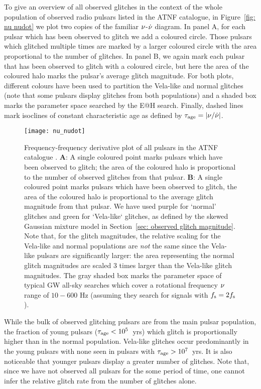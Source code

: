 \documentclass[../full_thesis/full_thesis.tex]{subfiles}
\begin{document}
To give an overview of all observed glitches in the context of the whole population of
observed radio pulsars listed in the ATNF catalogue, in Figure~\ref{fig: nu
nudot} we plot two copies of the familiar $\nu$-$\dot{\nu}$ diagram. In panel A, for each
pulsar which has been observed to glitch we add a coloured circle. Those
pulsars which glitched multiple times are marked by a larger coloured circle
with the area proportional to the number of glitches. In panel B, we again mark
each pulsar that has been observed to glitch with a coloured circle, but here
the area of the coloured halo marks the pulsar's average glitch magnitude.
For both plots, different
colours have been used to partition the Vela-like and normal glitches (note that some
pulsars display glitches from both populations) and a shaded box marks the
parameter space searched by the E@H search. Finally, dashed lines mark isoclines
of constant characteristic age as defined by $\tau_{\mathrm{age}} = \left|\nu/\dot{\nu}\right|$.
\begin{figure}[htb]
\centering
\texttt{[image: nu\_nudot]}
\caption{Frequency-frequency derivative plot of all pulsars in the ATNF
catalogue \citep{ATNF}. \textbf{A}: A single coloured point marks pulsars which have been
observed to glitch; the area of the coloured halo is proportional to the
number of observed glitches from that pulsar. \textbf{B}: A single coloured
point marks pulsars which have been observed to glitch, the area of the coloured
halo is proportional to the average glitch magnitude from that pulsar. We have used
purple for `normal' glitches and green for `Vela-like` glitches, as defined by
the skewed Gaussian mixture model in Section~\ref{sec: observed glitch magnitude}. Note
that, for the glitch magnitudes, the relative scaling for the Vela-like and
normal populations are \emph{not}
the same since the Vela-like pulsars are significantly larger: the area representing
the normal glitch magnitudes are scaled 3 times larger than the Vela-like glitch
magnitudes.
The gray shaded box marks the parameter space of typical GW all-sky searches which
cover a rotational frequency $\nu$ range of $10-600$ Hz (assuming they search for signals
with $f_{\textrm{s}}=2f_{\textrm{s}}$).}
\label{fig: nu nudot}
\end{figure}

While the bulk of observed glitching pulsars are from the main pulsar population, the
fraction of young pulsars ($\tau_{\mathrm{age}} < 10^{5}$~yrs) which glitch is proportionally
higher than in the normal population. Vela-like glitches occur predominantly
in the young pulsars with none seen in pulsars with $\tau_{\mathrm{age}} > 10^{7}$~yrs. It
is also noticeable that younger pulsars display a greater number of glitches. Note
that, since we have not observed all pulsars
for the some period of time, one cannot infer the relative glitch rate from the
number of glitches alone.
\end{document}

